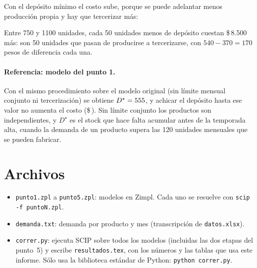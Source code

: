 \documentclass[11pt,a4paper]{article}
\begin{document}
Con el depósito mínimo el costo sube, porque se puede adelantar menos
producción propia y hay que tercerizar más:

\begin{center}
\small
\tablaCurvaCinco
\end{center}

Entre 750 y 1100 unidades, cada 50 unidades menos de depósito cuestan
\$\,8.500 más: son 50 unidades que pasan de producirse a tercerizarse, con
$540-370=170$ pesos de diferencia cada una.

\paragraph{Referencia: modelo del punto 1.} Con el mismo procedimiento sobre el
modelo original (sin límite mensual conjunto ni tercerización) se obtiene
$D^{\star} = 555$, y achicar el depósito hasta ese valor no aumenta el
costo (\$\,\costoDminuno{}). Sin límite conjunto los productos son
independientes, y $D^{\star}$ es el stock que hace falta acumular antes de la
temporada alta, cuando la demanda de un producto supera las 120 unidades
mensuales que se pueden fabricar.

\section*{Archivos}

\begin{itemize}[itemsep=1pt]
  \item \texttt{punto1.zpl} a \texttt{punto5.zpl}: modelos en Zimpl. Cada uno
    se resuelve con \texttt{scip -f puntoN.zpl}.
  \item \texttt{demanda.txt}: demanda por producto y mes (transcripción de
    \texttt{datos.xlsx}).
  \item \texttt{correr.py}: ejecuta SCIP sobre todos los modelos (incluidas las
    dos etapas del punto~5) y escribe \texttt{resultados.tex}, con los números
    y las tablas que usa este informe. Sólo usa la biblioteca estándar de
    Python: \texttt{python correr.py}.
\end{itemize}
\end{document}
